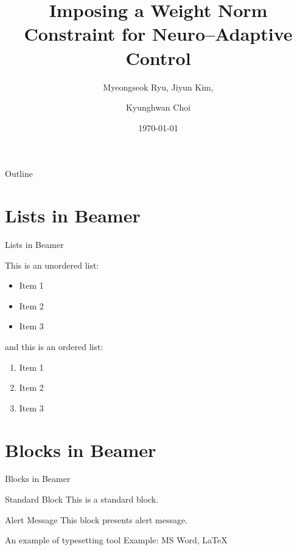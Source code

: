 \documentclass{beamer}
\title{
    Imposing a Weight Norm Constraint for Neuro–Adaptive Control 
}
\author{Myeongseok Ryu\inst{1}, Jiyun Kim\inst{2}, \and Kyunghwan Choi\inst{1}}
\date{\today}
\institute %
{
  \inst{1}%
  Department of Mechanical and Robotics Engineering\\
  Gwangju Institute of Science and Technology 
  \and
  \inst{2}%
  AI Graduate School\\
  Gwangju Institute of Science and Technology 
}
\begin{document}
\begin{frame}
    \titlepage 
\end{frame}

\logo{}


\begin{frame}{Outline}
    \tableofcontents
\end{frame}


\section{Lists in Beamer}
\begin{frame}{Lists in Beamer}

This is an unordered list:
\begin{itemize}
    \item Item 1
    \item Item 2
    \item Item 3
\end{itemize}

and this is an ordered list:
\begin{enumerate}
    \item Item 1
    \item Item 2
    \item Item 3
\end{enumerate}

\end{frame}


\section{Blocks in Beamer}
\begin{frame}{Blocks in Beamer}
    \begin{block}{Standard Block}
        This is a standard block.
    \end{block}
    \begin{alertblock}{Alert Message}
        This block presents alert message.
    \end{alertblock}
    \begin{exampleblock}{An example of typesetting tool}
        Example: MS Word, \LaTeX{}
    \end{exampleblock}
\end{frame} 
\end{document}
